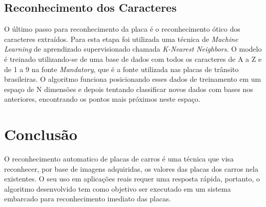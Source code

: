 \documentclass[a0,portrait]{a0poster}
\begin{document}
\begin{multicols}{2}
\color{NavyBlue}
\subsection*{Reconhecimento dos Caracteres}
\color{Black}
\Large
\justifying

O último passo para reconhecimento da placa é o reconhecimento ótico dos
caracteres extraídos. Para esta etapa foi utilizada uma técnica de \emph{Machine Learning}
de aprendizado supervisionado chamada \emph{K-Nearest Neighbors}.
O modelo é treinado utilizando-se de uma base de dados com todos os caracteres
de A a Z e de 1 a 9 na fonte \emph{Mandatory}, que é a fonte utilizada nas placas de
trânsito brasileiras. O algoritmo funciona posicionando esses dados de treinamento
em um espaço de N dimensões e depois tentando classificar novos dados com bases nos anteriores,
encontrando os pontos mais próximos neste espaço.

\color{NavyBlue}
\section*{\huge Conclusão}
\color{Black}

O reconhecimento automatico de placas de carros é uma técnica que visa reconhecer,
por base de imagens adquiridas, os valores das placas dos carros nela existentes.
O seu uso em aplicações reais requer uma resposta rápida, portanto, o algoritmo desenvolvido
tem como objetivo ser executado em um sistema embarcado para reconhecimento imediato das placas.

% 
% 

\end{multicols}

\end{document}

